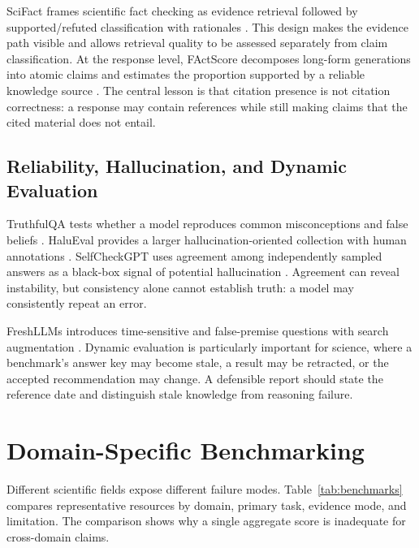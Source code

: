 \documentclass[manuscript,nonacm]{acmart}
\begin{document}
SciFact frames scientific fact checking as evidence retrieval followed by supported/refuted classification with rationales \cite{wadden2020scifact}. This design makes the evidence path visible and allows retrieval quality to be assessed separately from claim classification. At the response level, FActScore decomposes long-form generations into atomic claims and estimates the proportion supported by a reliable knowledge source \cite{min2023factscore}. The central lesson is that citation presence is not citation correctness: a response may contain references while still making claims that the cited material does not entail.

\subsection{Reliability, Hallucination, and Dynamic Evaluation}\label{sec:reliability}
TruthfulQA tests whether a model reproduces common misconceptions and false beliefs \cite{lin2022truthfulqa}. HaluEval provides a larger hallucination-oriented collection with human annotations \cite{li2023halueval}. SelfCheckGPT uses agreement among independently sampled answers as a black-box signal of potential hallucination \cite{manakul2023selfcheckgpt}. Agreement can reveal instability, but consistency alone cannot establish truth: a model may consistently repeat an error.

FreshLLMs introduces time-sensitive and false-premise questions with search augmentation \cite{vu2024freshllms}. Dynamic evaluation is particularly important for science, where a benchmark's answer key may become stale, a result may be retracted, or the accepted recommendation may change. A defensible report should state the reference date and distinguish stale knowledge from reasoning failure.

\section{Domain-Specific Benchmarking}\label{sec:domains}
Different scientific fields expose different failure modes. Table~\ref{tab:benchmarks} compares representative resources by domain, primary task, evidence mode, and limitation. The comparison shows why a single aggregate score is inadequate for cross-domain claims.
\end{document}
